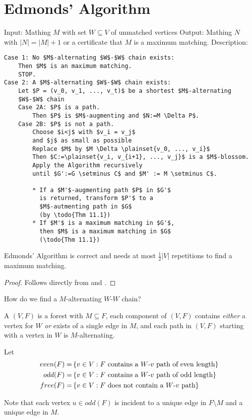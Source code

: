 \section*{Edmonds' Algorithm}
Input: Mathing $M$ with set $W \subseteq V$ of unmatched vertices
Output: Mathing $N$ with $|N| = |M| + 1$ or a certificate that $M$ is a
maximum matching.
Description:
\begin{lstlisting}
Case 1: No $M$-alternating $W$-$W$ chain exists:
	Then $M$ is an maximum matching. 
	STOP.
Case 2: A $M$-alternating $W$-$W$ chain exists:
	Let $P = (v_0, v_1, ..., v_t)$ be a shortest $M$-alternating 
	$W$-$W$ chain
	Case 2A: $P$ is a path.
		Then $P$ is $M$-augmenting and $N:=M \Delta P$.
	Case 2B: $P$ is not a path.
		Choose $i<j$ with $v_i = v_j$ 
		and $j$ as small as possible
		Replace $M$ by $M \Delta \plainset{v_0, ..., v_i}$
		Then $C:=\plainset{v_i, v_{i+1}, ..., v_j}$ is a $M$-blossom.
		Apply the Algorithm recursively 
		until $G':=G \setminus C$ and $M' := M \setminus C$.
		
		* If a $M'$-augmenting path $P$ in $G'$
		  is returned, transform $P'$ to a 
		  $M$-autmenting path in $G$ 
		  (by \todo{Thm 11.1})
		* If $M'$ is a maximum matching in $G'$, 
		  then $M$ is a maximum matching in $G$
		  (\todo{Thm 11.1})
\end{lstlisting}
\begin{thm}
	Edmonds' Algorithm is correct and needs at most $\frac12 |V|$ repetitions to find a maximum matching.
\end{thm}

\begin{proof}
	Follows directly from  and .
\end{proof}

How do we find a $M$-alternating $W$-$W$ chain?
\begin{defn}
	A  $(V,F)$ is a
	forest with $ M \subseteq F$, each component of $(V,F)$ contains 
	\emph{either} a vertex for $W$ \emph{or} exists of a single edge in $M$,
	and each path in $(V,F)$ starting with a vertex in $W$ is 
	$M$-alternating.
	
	Let \begin{align*}
		even(F) =& \left\{ v \in V: F \text{ contains a $W$-$v$ path of even length}\right\} \\
		odd(F) =& \left\{ v \in V: F \text{ contains a $W$-$v$ path of odd length}\right\} \\
		free(F) =& \left\{ v \in V: F \text{ does not contain a $W$-$v$ path}\right\} 
	\end{align*}
	
	
	Note that each vertex $u \in odd(F)$ is incident to a unique edge in
	$F \setminus M$ and a unique edge in $M$.
\end{defn}

